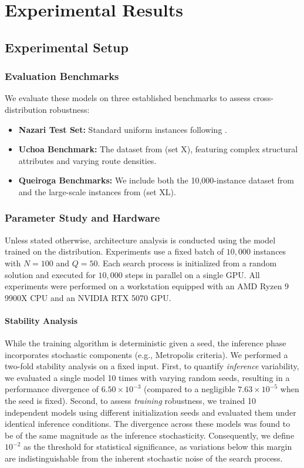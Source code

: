 \documentclass[letterpaper]{article} %
\begin{document}
\section{Experimental Results}
\label{sec:experiments}

\subsection{Experimental Setup}

\subsubsection{Evaluation Benchmarks}
We evaluate these models on three established benchmarks to assess cross-distribution robustness:
\begin{itemize}
    \item \textbf{Nazari Test Set:} Standard uniform instances following \cite{nazari_reinforcement_2018}.
    \item \textbf{Uchoa Benchmark:} The dataset from \cite{uchoa_new_2017} (set X), featuring complex structural attributes and varying route densities.
    \item \textbf{Queiroga Benchmarks:} We include both the 10,000-instance dataset from \cite{queiroga_10000_nodate} and the large-scale instances from \cite{queiroga_xl_2026} (set XL).
\end{itemize}

\subsubsection{Parameter Study and Hardware}
Unless stated otherwise, architecture analysis is conducted using the model trained on the \cite{nazari_reinforcement_2018} distribution. Experiments use a fixed batch of $10{,}000$ instances with $N = 100$ and $Q=50$. Each search process is initialized from a random solution and executed for $10{,}000$ steps in parallel on a single GPU.
All experiments were performed on a workstation equipped with an AMD Ryzen 9 9900X CPU and an NVIDIA RTX 5070 GPU. 

\paragraph{Stability Analysis}
While the training algorithm is deterministic given a seed, the inference phase incorporates stochastic components (e.g., Metropolis criteria). We performed a two-fold stability analysis on a fixed input. First, to quantify \textit{inference} variability, we evaluated a single model 10 times with varying random seeds, resulting in a performance divergence of $6.50 \times 10^{-3}$ (compared to a negligible $7.63 \times 10^{-5}$ when the seed is fixed). Second, to assess \textit{training} robustness, we trained 10 independent models using different initialization seeds and evaluated them under identical inference conditions. The divergence across these models was found to be of the same magnitude as the inference stochasticity. Consequently, we define $10^{-2}$ as the threshold for statistical significance, as variations below this margin are indistinguishable from the inherent stochastic noise of the search process.
\end{document}
